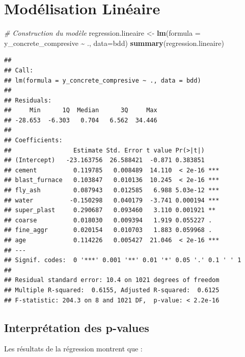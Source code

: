 \documentclass[
  12pt,
]{article}
\newenvironment{Shaded}{\begin{snugshade}}{\end{snugshade}}
\newcommand{\AttributeTok}[1]{\textcolor[rgb]{0.13,0.29,0.53}{#1}}
\newcommand{\CommentTok}[1]{\textcolor[rgb]{0.56,0.35,0.01}{\textit{#1}}}
\newcommand{\FunctionTok}[1]{\textcolor[rgb]{0.13,0.29,0.53}{\textbf{#1}}}
\newcommand{\NormalTok}[1]{#1}
\newcommand{\OtherTok}[1]{\textcolor[rgb]{0.56,0.35,0.01}{#1}}
\newcommand{\SpecialCharTok}[1]{\textcolor[rgb]{0.81,0.36,0.00}{\textbf{#1}}}
\begin{document}
\section{Modélisation Linéaire}\label{moduxe9lisation-linuxe9aire}

\begin{Shaded}
\begin{Highlighting}[]
\CommentTok{\# Construction du modèle}
\NormalTok{regression.lineaire }\OtherTok{\textless{}{-}} \FunctionTok{lm}\NormalTok{(}\AttributeTok{formula =}\NormalTok{ y\_concrete\_compresive }\SpecialCharTok{\textasciitilde{}}\NormalTok{ ., }\AttributeTok{data=}\NormalTok{bdd)}
\FunctionTok{summary}\NormalTok{(regression.lineaire)}
\end{Highlighting}
\end{Shaded}

\begin{verbatim}
## 
## Call:
## lm(formula = y_concrete_compresive ~ ., data = bdd)
## 
## Residuals:
##     Min      1Q  Median      3Q     Max 
## -28.653  -6.303   0.704   6.562  34.446 
## 
## Coefficients:
##                 Estimate Std. Error t value Pr(>|t|)    
## (Intercept)   -23.163756  26.588421  -0.871 0.383851    
## cement          0.119785   0.008489  14.110  < 2e-16 ***
## blast_furnace   0.103847   0.010136  10.245  < 2e-16 ***
## fly_ash         0.087943   0.012585   6.988 5.03e-12 ***
## water          -0.150298   0.040179  -3.741 0.000194 ***
## super_plast     0.290687   0.093460   3.110 0.001921 ** 
## coarse          0.018030   0.009394   1.919 0.055227 .  
## fine_aggr       0.020154   0.010703   1.883 0.059968 .  
## age             0.114226   0.005427  21.046  < 2e-16 ***
## ---
## Signif. codes:  0 '***' 0.001 '**' 0.01 '*' 0.05 '.' 0.1 ' ' 1
## 
## Residual standard error: 10.4 on 1021 degrees of freedom
## Multiple R-squared:  0.6155, Adjusted R-squared:  0.6125 
## F-statistic: 204.3 on 8 and 1021 DF,  p-value: < 2.2e-16
\end{verbatim}

\subsection{Interprétation des
p-values}\label{interpruxe9tation-des-p-values}

Les résultats de la régression montrent que :
\end{document}
